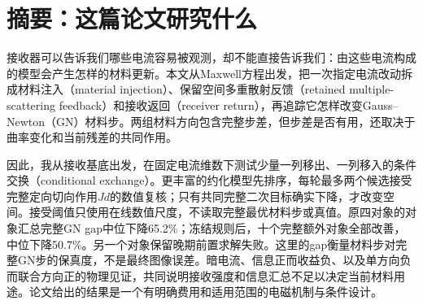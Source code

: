 \section*{摘要：这篇论文研究什么}
接收器可以告诉我们哪些电流容易被观测，却不能直接告诉我们：由这些电流构成的模型会产生怎样的材料更新。本文从Maxwell方程出发，把一次指定电流改动拆成材料注入（material injection）、保留空间多重散射反馈（retained multiple-scattering feedback）和接收返回（receiver return），再追踪它怎样改变Gauss--Newton（GN）材料步。两组材料方向包含完整步差，但步差是否有用，还取决于曲率变化和当前残差的共同作用。

因此，我从接收基底出发，在固定电流维数下测试少量一列移出、一列移入的条件交换（conditional exchange）。更丰富的约化模型先排序，每轮最多两个候选接受完整定向切向作用$Jd$的数值复核；只有共同完整二次目标确实下降，才改变空间。接受阈值只使用在线数值尺度，不读取完整最优材料步或真值。原四对象的对象汇总完整GN gap中位下降65.2\%；冻结规则后，十个完整额外对象全部改善，中位下降50.7\%。另一个对象保留晚期前置求解失败。这里的gap衡量材料步对完整GN步的保真度，不是最终图像误差。暗电流、信息正而收益负、以及单方向负而联合方向正的物理见证，共同说明接收强度和信息汇总不足以决定当前材料用途。论文给出的结果是一个有明确费用和适用范围的电磁机制与条件设计。
